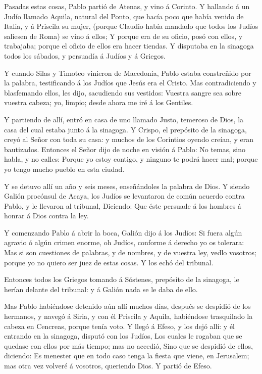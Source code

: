  Pasadas estas cosas, Pablo partió de Atenas, y vino á
Corinto.  Y hallando á un Judío llamado Aquila, natural del
Ponto, que hacía poco que había venido de Italia, y á Priscila su mujer,
(porque Claudio había mandado que todos los Judíos saliesen de Roma) se
vino á ellos;  Y porque era de su oficio, posó con ellos, y
trabajaba; porque el oficio de ellos era hacer tiendas.  Y
disputaba en la sinagoga todos los sábados, y persuadía á Judíos y á
Griegos.

 Y cuando Silas y Timoteo vinieron de Macedonia, Pablo
estaba constreñido por la palabra, testificando á los Judíos que Jesús
era el Cristo.  Mas contradiciendo y blasfemando ellos, les
dijo, sacudiendo sus vestidos: Vuestra sangre sea sobre vuestra cabeza;
yo, limpio; desde ahora me iré á los Gentiles.

 Y partiendo de allí, entró en casa de uno llamado Justo,
temeroso de Dios, la casa del cual estaba junto á la sinagoga.
 Y Crispo, el prepósito de la sinagoga, creyó al Señor con
toda su casa: y muchos de los Corintios oyendo creían, y eran
bautizados.  Entonces el Señor dijo de noche en visión á
Pablo: No temas, sino habla, y no calles:  Porque yo estoy
contigo, y ninguno te podrá hacer mal; porque yo tengo mucho pueblo en
esta ciudad.

 Y se detuvo allí un año y seis meses, enseñándoles la
palabra de Dios.  Y siendo Galión procónsul de Acaya, los
Judíos se levantaron de común acuerdo contra Pablo, y le llevaron al
tribunal,  Diciendo: Que éste persuade á los hombres á
honrar á Dios contra la ley.

 Y comenzando Pablo á abrir la boca, Galión dijo á los
Judíos: Si fuera algún agravio ó algún crimen enorme, oh Judíos,
conforme á derecho yo os tolerara:  Mas si son cuestiones
de palabras, y de nombres, y de vuestra ley, vedlo vosotros; porque yo
no quiero ser juez de estas cosas.  Y los echó del
tribunal.

 Entonces todos los Griegos tomando á Sóstenes, prepósito
de la sinagoga, le herían delante del tribunal: y á Galión nada se le
daba de ello.

 Mas Pablo habiéndose detenido aún allí muchos días,
después se despidió de los hermanos, y navegó á Siria, y con él Priscila
y Aquila, habiéndose trasquilado la cabeza en Cencreas, porque tenía
voto.  Y llegó á Efeso, y los dejó allí: y él entrando en
la sinagoga, disputó con los Judíos,  Los cuales le rogaban
que se quedase con ellos por más tiempo; mas no accedió, 
Sino que se despidió de ellos, diciendo: Es menester que en todo caso
tenga la fiesta que viene, en Jerusalem; mas otra vez volveré á
vosotros, queriendo Dios. Y partió de Efeso.

